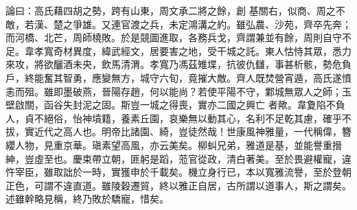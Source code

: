 \begin{pinyinscope}
 論曰：高氏藉四胡之勢，跨有山東，周文承二將之餘，創
 基關右，似商、周之不敵，若漢、楚之爭雄。又連官渡之兵，未定鴻溝之約。雖弘農、沙苑，齊卒先奔；而河橋、北芒，周師橈敗。於是競圖進取，各務兵戈，齊謂兼並有餘，周則自守不足。韋孝寬奇材異度，緯武經文，居要害之地，受干城之託。東人怙恃其眾，悉力來攻，將欲釃酒未央，飲馬清渭。孝寬乃馮茲雉堞，抗彼仇讎，事甚析骸，勢危負戶，終能奮其智勇，應變無方，城守六旬，竟摧大敵。齊人既焚營宵遁，高氏遂憤恚而殂。雖即墨破燕，晉陽存趙，何以能尚？若使平陽不守，鄴城無眾人之師；玉壁啟關，函谷失封泥之固。斯豈一城之得喪，實亦二國之興亡
 者歟。韋夐陷不負人，貞不絕俗，怡神墳籍，養素丘園，哀樂無以動其心，名利不足乾其慮，確乎不拔，實近代之高人也。明帝比諸園、綺，豈徒然哉！世康風神雅量，一代稱偉，簪纓人物，見重京華。瑱素望高風，亦云美矣。柳虯兄弟，雅道是基，並能譽重搢紳，豈虛至也。慶束帶立朝，匪躬是蹈，蒞官從政，清白著美。至於畏避權寵，違忤宰臣，雖取詘於一時，實獲申於千載矣。機立身行已，本以寬雅流譽，至於登朝正色，可謂不違直道。雖陵穀遷貿，終以雅正自居，古所謂以道事人，斯之謂矣。述雖幹略見稱，終乃敗於驕寵，惜矣。



\end{pinyinscope}
